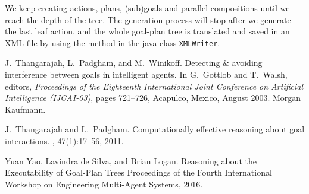 \documentclass[11pt, a4paper]{article}
\begin{document}
We keep creating actions, plans, (sub)goals and parallel compositions until we reach the depth of the tree. The generation process will stop after we generate the last leaf action, and the whole goal-plan tree is translated and saved in an XML file by using the method in the java class \texttt{XMLWriter}. 






%
\begin{thebibliography}{10}

J.~Thangarajah, L.~Padgham, and M.~Winikoff.
\newblock Detecting {\&} avoiding interference between goals in intelligent
  agents.
\newblock In G.~Gottlob and T.~Walsh, editors, {\em Proceedings of the
  Eighteenth International Joint Conference on Artificial Intelligence
  ({IJCAI}-03)}, pages 721--726, Acapulco, Mexico, August 2003. Morgan
  Kaufmann.

J.~Thangarajah and L.~Padgham.
\newblock Computationally effective reasoning about goal interactions.
, 47(1):17--56, 2011.

Yuan Yao, Lavindra de Silva, and Brian Logan.
\newblock Reasoning about the Executability of Goal-Plan Trees
\newblock Proceedings of the Fourth International Workshop on Engineering Multi-Agent Systems, 2016.
\end{thebibliography}
\end{document}
